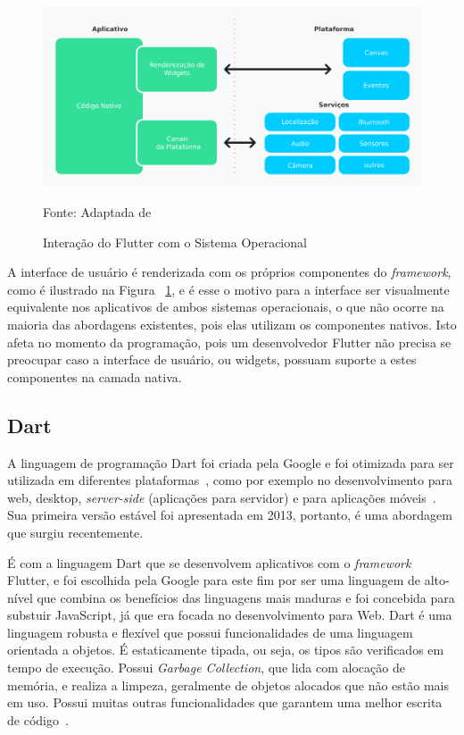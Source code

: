 \begin{figure}[H]
    \centering
    \includegraphics[width=15cm]{imagens/interacaoFlutter}
    \caption{Interação do Flutter com o Sistema Operacional}
    Fonte: Adaptada de~\cite{yatsenko2019comparative}
    \label{fig: Interação Flutter SO}
\end{figure}

A interface de usuário é renderizada com os próprios componentes do \textit{framework}, como é ilustrado na Figura ~\ref{fig: Interação Flutter SO}, e é esse o motivo para a interface ser visualmente equivalente nos aplicativos de ambos sistemas operacionais, o que não ocorre na maioria das abordagens existentes, pois elas utilizam os componentes nativos.
Isto afeta no momento da programação, pois um desenvolvedor Flutter não precisa se preocupar caso a interface de usuário, ou widgets, possuam suporte a estes componentes na camada nativa\cite{zammetti2019practical}.

\subsection{Dart}\label{subsec:dart}

A linguagem de programação Dart foi criada pela Google e foi otimizada para ser utilizada em diferentes plataformas~\cite{clow2019flutter}, como por exemplo no desenvolvimento para web, desktop, \textit{server-side} (aplicações para servidor) e para aplicações móveis~\cite{biessek2019dart}.
Sua primeira versão estável foi apresentada em 2013, portanto, é uma abordagem que surgiu recentemente.

É com a linguagem Dart que se desenvolvem aplicativos com o \textit{framework} Flutter, e foi escolhida pela Google para este fim por ser uma linguagem de alto-nível que combina os benefícios das linguagens mais maduras e foi concebida para substuir JavaScript, já que era focada no desenvolvimento para Web.
Dart é uma linguagem robusta e flexível que possui funcionalidades de uma linguagem orientada a objetos.
É estaticamente tipada, ou seja, os tipos são verificados em tempo de execução.
Possui \textit{Garbage Collection}, que lida com alocação de memória, e realiza a limpeza, geralmente de objetos alocados que não estão mais em uso.
Possui muitas outras funcionalidades que garantem uma melhor escrita de código~\cite{biessek2019dart}.

